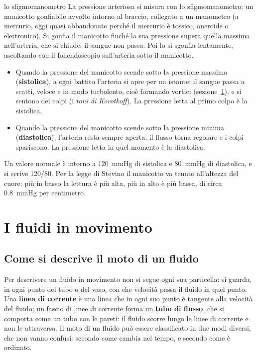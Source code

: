 \begin{applicazione}{lo sfigmomanometro}
La pressione arteriosa si misura con lo sfigmomanometro: un manicotto gonfiabile avvolto intorno al braccio, collegato a un manometro (a mercurio, oggi quasi abbandonato perché il mercurio è tossico, aneroide o elettronico). Si gonfia il manicotto finché la sua pressione supera quella massima nell'arteria, che si chiude: il sangue non passa. Poi lo si sgonfia lentamente, ascoltando con il fonendoscopio sull'arteria sotto il manicotto.
\begin{itemize}
  \item Quando la pressione del manicotto scende sotto la pressione massima (\textbf{sistolica}), a ogni battito l'arteria si apre per un istante: il sangue passa a scatti, veloce e in modo turbolento, cioè formando vortici (sezione~\ref{sec:ud3-moto}), e si sentono dei colpi (i \emph{toni di Korotkoff}). La pressione letta al primo colpo è la sistolica.
  \item Quando la pressione del manicotto scende sotto la pressione minima (\textbf{diastolica}), l'arteria resta sempre aperta, il flusso torna regolare e i colpi spariscono. La pressione letta in quel momento è la diastolica.
\end{itemize}
Un valore normale è intorno a \SI{120}{\mmHg} di sistolica e \SI{80}{\mmHg} di diastolica, e si scrive 120/80. Per la legge di Stevino il manicotto va tenuto all'altezza del cuore: più in basso la lettura è più alta, più in alto è più bassa, di circa \SI{0,8}{\mmHg} per centimetro.
\end{applicazione}



\section{I fluidi in movimento}
\label{sec:ud3-moto}

\subsection{Come si descrive il moto di un fluido}

Per descrivere un fluido in movimento non si segue ogni sua particella: si guarda, in ogni punto del tubo o del vaso, con che velocità passa il fluido in quel punto. Una \textbf{linea di corrente} è una linea che in ogni suo punto è tangente alla velocità del fluido; un fascio di linee di corrente forma un \textbf{tubo di flusso}, che si comporta come un tubo con le pareti: il fluido scorre lungo le linee di corrente e non le attraversa. Il moto di un fluido può essere classificato in due modi diversi, che non vanno confusi: secondo come cambia nel tempo, e secondo come è ordinato.

